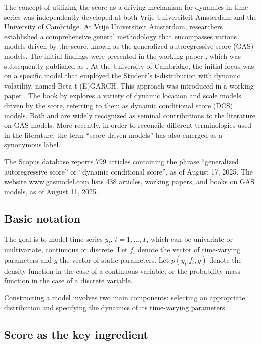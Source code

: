 The concept of utilizing the score as a driving mechanism for dynamics in time series was independently developed at both Vrije Universiteit Amsterdam and the University of Cambridge. At Vrije Universiteit Amsterdam, researchers established a comprehensive general methodology that encompasses various models driven by the score, known as the generalized autoregressive score (GAS) models. The initial findings were presented in the working paper \citet{Creal2008}, which was subsequently published as \citet{Creal2013}. At the University of Cambridge, the initial focus was on a specific model that employed the Student's t-distribution with dynamic volatility, named Beta-t-(E)GARCH. This approach was introduced in a working paper \citet{Harvey2008}. The book by \citet{Harvey2013} explores a variety of dynamic location and scale models driven by the score, referring to them as dynamic conditional score (DCS) models. Both \citet{Creal2013} and \citet{Harvey2013} are widely recognized as seminal contributions to the literature on GAS models. More recently, in order to reconcile different terminologies used in the literature, the term ``score-driven models'' has also emerged as a synonymous label.

The Scopus database reports 799 articles containing the phrase ``generalized autoregressive score'' or ``dynamic conditional score'', as of August 17, 2025. The website \url{www.gasmodel.com} lists 438 articles, working papers, and books on GAS models, as of August 11, 2025.

\subsection{Basic notation}\label{basic-notation}

The goal is to model time series \(y_t\), \(t=1,\ldots,T\), which can be univariate or multivariate, continuous or discrete. Let \(f_t\) denote the vector of time-varying parameters and \(g\) the vector of static parameters. Let \(p(y_t|f_t,g)\) denote the density function in the case of a continuous variable, or the probability mass function in the case of a discrete variable.

Constructing a model involves two main components: selecting an appropriate distribution and specifying the dynamics of its time-varying parameters.

\subsection{Score as the key ingredient}\label{score-as-the-key-ingredient}

